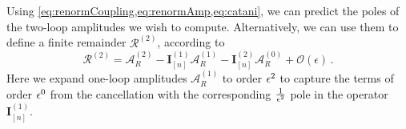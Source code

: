 

Using \cref{eq:renormCoupling,eq:renormAmp,eq:catani}, we can predict
the poles of the two-loop amplitudes we wish to compute. Alternatively, we
can use them to define a finite remainder $\mathcal{R}^{(2)}$, according to
\begin{equation}\label{eq:remaindeDef}
  \mathcal{R}^{(2)}=\mathcal{A}_R^{(2)}
  -\mathbf{I}_{[n]}^{(1)}\mathcal{A}_R^{(1)}
  -\mathbf{I}_{[n]}^{(2)}\mathcal{A}_R^{(0)}
  +\mathcal{O}(\epsilon)\,.
\end{equation}
Here we expand one-loop amplitudes $\mathcal{A}_R^{(1)}$ to order $\epsilon^2$ to capture the terms of order $\epsilon^0$
from the cancellation with the corresponding $\frac{1}{\epsilon^2}$ pole in the operator $\mathbf{I}_{[n]}^{(1)}$.

